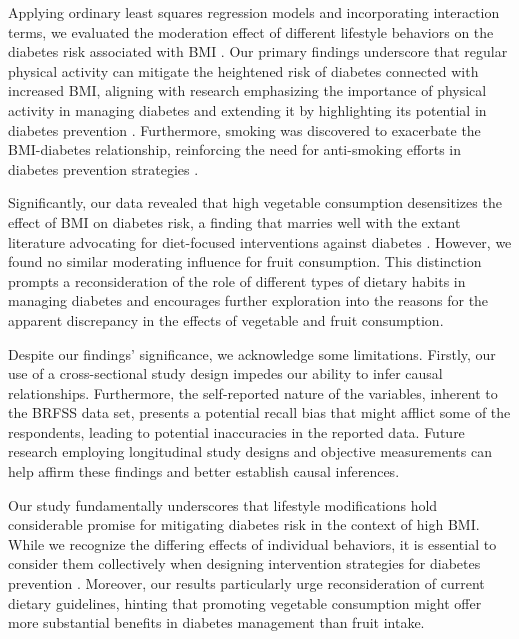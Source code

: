 \documentclass[11pt]{article}
\begin{document}
Applying ordinary least squares regression models and incorporating interaction terms, we evaluated the moderation effect of different lifestyle behaviors on the diabetes risk associated with BMI \cite{Sambola2003RoleOR, Rochlani2017MetabolicSP, Stumvoll2000UseOT}. Our primary findings underscore that regular physical activity can mitigate the heightened risk of diabetes connected with increased BMI, aligning with research emphasizing the importance of physical activity in managing diabetes and extending it by highlighting its potential in diabetes prevention \cite{Bohn2015ImpactOP, Reis2011LifestyleFA}. Furthermore, smoking was discovered to exacerbate the BMI-diabetes relationship, reinforcing the need for anti-smoking efforts in diabetes prevention strategies \cite{Ng2019SmokingDD, Shi2013PhysicalAS}.

Significantly, our data revealed that high vegetable consumption desensitizes the effect of BMI on diabetes risk, a finding that marries well with the extant literature advocating for diet-focused interventions against diabetes \cite{Delgado-Velandia2022HealthyLM, Li2017TimeTO}. However, we found no similar moderating influence for fruit consumption. This distinction prompts a reconsideration of the role of different types of dietary habits in managing diabetes and encourages further exploration into the reasons for the apparent discrepancy in the effects of vegetable and fruit consumption.

Despite our findings' significance, we acknowledge some limitations. Firstly, our use of a cross-sectional study design impedes our ability to infer causal relationships. Furthermore, the self-reported nature of the variables, inherent to the BRFSS data set, presents a potential recall bias that might afflict some of the respondents, leading to potential inaccuracies in the reported data. Future research employing longitudinal study designs and objective measurements can help affirm these findings and better establish causal inferences.

Our study fundamentally underscores that lifestyle modifications hold considerable promise for mitigating diabetes risk in the context of high BMI. While we recognize the differing effects of individual behaviors, it is essential to consider them collectively when designing intervention strategies for diabetes prevention \cite{Bernab-Ortiz2015ContributionOM}. Moreover, our results particularly urge reconsideration of current dietary guidelines, hinting that promoting vegetable consumption might offer more substantial benefits in diabetes management than fruit intake.
\end{document}

